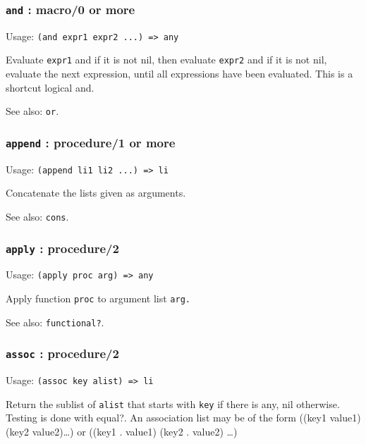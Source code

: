 \documentclass[
]{article}
\newcommand{\passthrough}[1]{#1}
\begin{document}
\hypertarget{and-macro0-or-more}{%
\subsubsection{\texorpdfstring{\texttt{and} : macro/0 or
more}{and : macro/0 or more}}\label{and-macro0-or-more}}

Usage: \passthrough{\lstinline!(and expr1 expr2 ...) => any!}

Evaluate \passthrough{\lstinline!expr1!} and if it is not nil, then
evaluate \passthrough{\lstinline!expr2!} and if it is not nil, evaluate
the next expression, until all expressions have been evaluated. This is
a shortcut logical and.

See also: \passthrough{\lstinline!or!}.

\hypertarget{append-procedure1-or-more}{%
\subsubsection{\texorpdfstring{\texttt{append} : procedure/1 or
more}{append : procedure/1 or more}}\label{append-procedure1-or-more}}

Usage: \passthrough{\lstinline!(append li1 li2 ...) => li!}

Concatenate the lists given as arguments.

See also: \passthrough{\lstinline!cons!}.

\hypertarget{apply-procedure2}{%
\subsubsection{\texorpdfstring{\texttt{apply} :
procedure/2}{apply : procedure/2}}\label{apply-procedure2}}

Usage: \passthrough{\lstinline!(apply proc arg) => any!}

Apply function \passthrough{\lstinline!proc!} to argument list
\passthrough{\lstinline!arg.!}

See also: \passthrough{\lstinline!functional?!}.

\hypertarget{assoc-procedure2}{%
\subsubsection{\texorpdfstring{\texttt{assoc} :
procedure/2}{assoc : procedure/2}}\label{assoc-procedure2}}

Usage: \passthrough{\lstinline!(assoc key alist) => li!}

Return the sublist of \passthrough{\lstinline!alist!} that starts with
\passthrough{\lstinline!key!} if there is any, nil otherwise. Testing is
done with equal?. An association list may be of the form ((key1
value1)(key2 value2)\ldots) or ((key1 . value1) (key2 . value2) \ldots)
\end{document}

